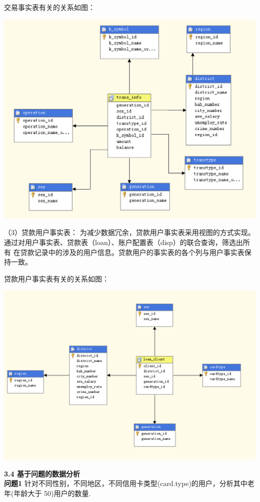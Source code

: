 \documentclass[a4paper]{article}
\begin{document}
\begin{enumerate}
  交易事实表有关的关系如图：
  \begin{center}
    \includegraphics[scale=0.38]{Pictures/TRANSP}
  \end{center}
  
  （3）贷款用户事实表：
  为减少数据冗余，贷款用户事实表采用视图的方式实现。通过对用户事实表、贷款表（loan）、账户配置表（disp）的联合查询，筛选出所有
  在贷款记录中的涉及的用户信息。贷款用户的事实表的各个列与用户事实表保持一致。

  贷款用户事实表有关的关系如图：
  \begin{center}
    \includegraphics[scale=0.38]{Pictures/LOANP}
  \end{center}

  
  \medskip
  \textbf{3.4 基于问题的数据分析}\\
  \textbf{问题1} 针对不同性别，不同地区，不同信用卡类型(card.type)的用户，分析其中老年(年龄大于 50)用户的数量.


\end{enumerate}
\end{document}
